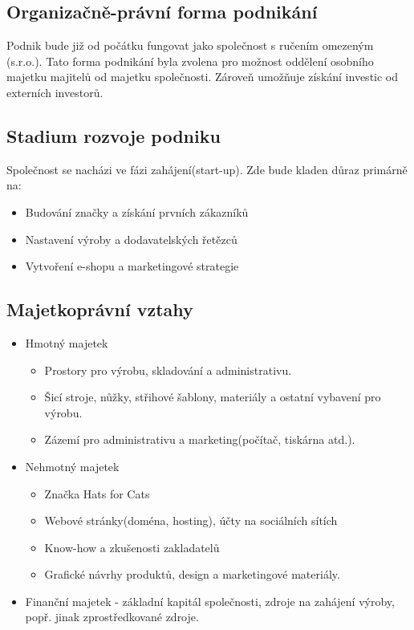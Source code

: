 \documentclass[12pt, a4paper]{article}
\begin{document}
\subsection{Organizačně-právní forma podnikání}
Podnik bude již od počátku fungovat jako společnost s ručením omezeným (s.r.o.).
Tato forma podnikání byla zvolena pro možnost oddělení osobního majetku majitelů od majetku společnosti.
Zároveň umožňuje získání investic od externích investorů.

\subsection{Stadium rozvoje podniku}
Společnost se nacházi ve fázi zahájení(start-up). Zde bude kladen důraz primárně na:
\begin{itemize}
  \item Budování značky a získání prvních zákazníků
  \item Nastavení výroby a dodavatelských řetězců
  \item Vytvoření e-shopu a marketingové strategie
\end{itemize}

\subsection{Majetkoprávní vztahy}

\begin{itemize}
  \item Hmotný majetek
  \begin{itemize}
    \item Prostory pro výrobu, skladování a administrativu.
    \item Šicí stroje, nůžky, střihové šablony, materiály a ostatní vybavení pro výrobu.
    \item Zázemí pro administrativu a marketing(počítač, tiskárna atd.).
  \end{itemize}
  \item Nehmotný majetek
  \begin{itemize}
    \item Značka Hats for Cats
    \item Webové stránky(doména, hosting), účty na sociálních sítích
    \item Know-how a zkušenosti zakladatelů
    \item Grafické návrhy produktů, design a marketingové materiály.
  \end{itemize}
  \item{Finanční majetek} - základní kapitál společnosti, zdroje na zahájení výroby, popř. jinak zprostředkované zdroje.
\end{itemize}
\end{document}
